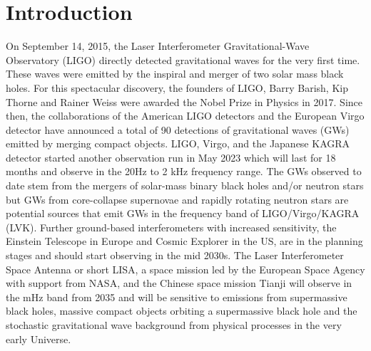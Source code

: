 \documentclass[%
 reprint,
 amsmath,amssymb,
 aps,
]{revtex4-2}
\begin{document}
\maketitle


\section{\label{sec:introduction} Introduction}
On September 14, 2015, the Laser Interferometer Gravitational-Wave Observatory (LIGO) directly detected gravitational waves for the very first time. These waves were emitted by the inspiral and merger of two solar mass black holes. For this spectacular discovery, the founders of LIGO, Barry Barish, Kip Thorne and Rainer Weiss were awarded the Nobel Prize in Physics in 2017.  Since then, the collaborations of the American LIGO detectors and the European Virgo detector have announced a total of 90 detections of gravitational waves (GWs) emitted by merging compact objects. LIGO, Virgo, and the Japanese KAGRA detector started another observation run in May 2023 which will last for 18 months and observe in the 20Hz to 2 kHz frequency range. The GWs observed to date stem from the mergers of solar-mass binary black holes and/or neutron stars but GWs from core-collapse supernovae and rapidly rotating neutron stars are potential sources that emit GWs in the frequency band of LIGO/Virgo/KAGRA (LVK).
Further  ground-based interferometers with increased sensitivity, the Einstein Telescope in Europe and Cosmic Explorer in the US, are in the planning stages and should start observing in the mid 2030s. The Laser Interferometer Space Antenna or short LISA, a space mission led by the European Space Agency with support from NASA, and the Chinese space mission Tianji will observe in the mHz band from 2035 and will be sensitive to emissions from supermassive black holes, massive compact objects orbiting a supermassive black hole and the stochastic gravitational wave background from physical processes in the very early Universe.
\end{document}
